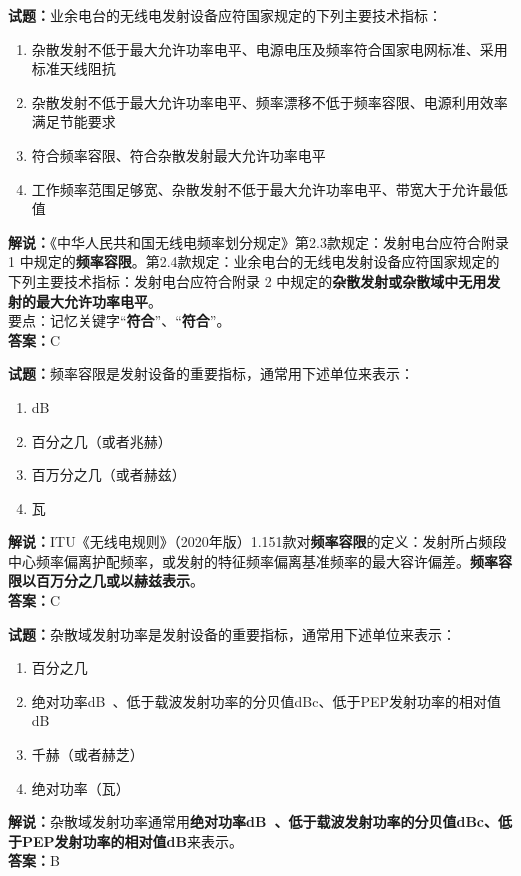 \documentclass{ctexbook}
\begin{document}
\bigskip




\noindent\textbf{试题：}业余电台的无线电发射设备应符国家规定的下列主要技术指标：
\begin{enumerate}[leftmargin=3em]
\item 杂散发射不低于最大允许功率电平、电源电压及频率符合国家电网标准、采用标准天线阻抗
\item 杂散发射不低于最大允许功率电平、频率漂移不低于频率容限、电源利用效率满足节能要求
\item 符合频率容限、符合杂散发射最大允许功率电平
\item 工作频率范围足够宽、杂散发射不低于最大允许功率电平、带宽大于允许最低值
\end{enumerate}
\noindent\textbf{解说：}《中华人民共和国无线电频率划分规定》第2.3款规定：发射电台应符合附录 1 中规定的\textbf{频率容限}。第2.4款规定：业余电台的无线电发射设备应符国家规定的下列主要技术指标：发射电台应符合附录 2 中规定的\textbf{杂散发射或杂散域中无用发射的最大允许功率电平}。\\要点：记忆关键字“\textbf{符合}”、“\textbf{符合}”。\\\noindent\textbf{答案：}C

\bigskip




\noindent\textbf{试题：}频率容限是发射设备的重要指标，通常用下述单位来表示：
\begin{enumerate}[leftmargin=3em]
\item dB
\item 百分之几（或者兆赫）
\item 百万分之几（或者赫兹）
\item 瓦
\end{enumerate}
\noindent\textbf{解说：}ITU《无线电规则》（2020年版）1.151款对\textbf{频率容限}的定义：发射所占频段中心频率偏离护配频率，或发射的特征频率偏离基准频率的最大容许偏差。\textbf{频率容限以百万分之几或以赫兹表示}。\\\noindent\textbf{答案：}C

\bigskip




\noindent\textbf{试题：}杂散域发射功率是发射设备的重要指标，通常用下述单位来表示：
\begin{enumerate}[leftmargin=3em]
\item 百分之几
\item 绝对功率\unit[qualifier-mode=combine]{\deci\bel{}}、低于载波发射功率的分贝值dBc、低于PEP发射功率的相对值dB
\item 千赫（或者赫芝）
\item 绝对功率（瓦）
\end{enumerate}
\noindent\textbf{解说：}杂散域发射功率通常用\textbf{绝对功率\unit[qualifier-mode=combine]{\deci\bel{}}、低于载波发射功率的分贝值dBc、低于PEP发射功率的相对值dB}来表示。\\\noindent\textbf{答案：}B
\end{document}
